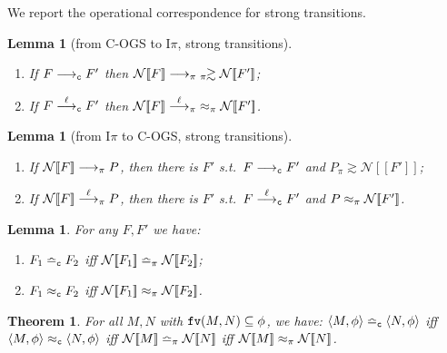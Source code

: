 \documentclass[11pt,a4paper]{amsart}
\theoremstyle{plain}
\theoremstyle{definition}
\theoremstyle{defC}
\theoremstyle{thmC}
\theoremstyle{plain}
\numberwithin{equation}{section}
\newcommand{\wb}{\bsim}
\newcommand{\bsim}{\wbPI} %
\newcommand{\pairP}[1]{  #1 }      %
\newcommand{\COGS}{\mbox{{\rm C-OGS}}\xspace}      %
\def\fv#1{\mbox{\tt fv}(#1)}         %
\newcommand{\rmm}[1]{{\tt{\lowercase{#1}}}}
\newcommand{\genarr}[2]{\mathrel{\stackrel{{#1}}{\longrightarrow}_{\rmm{\lowercase{#2}}}}}
\newcommand{\genlongrightarrow}[1]{\mathrel{\longrightarrow_{\rmm{\lowercase{#1}}}}}
\newcommand{\arrPI}[1]{\genarr{#1}{\pi}}   %
\newcommand{\longrightarrowPI}{\genlongrightarrow{\pi}}
\newcommand{\arrC}[1]{\genarr{#1}{C}}   %
\newcommand{\longrightarrowp}{\genlongrightarrow{C}}
\newcommand{\genTE}[1]{\mathrel{\bumpeq_{\rmm{\lowercase{#1}}}}}       %
\newcommand{\genwb}[1]{\mathrel{\approx_{\rmm{\lowercase{#1}}}}}       %
\newcommand{\wbPI}{\genwb{\pi}}       %
\newcommand{\wbC}{\genwb{C}}       %
\newcommand{\TEPI}{\genTE{\pi}}       %
\newcommand{\TEp}{\genTE{C}}       %
\newcommand{\contr}{\mathrel{\mbox{}_{\pi}\!\!\gtrsim}}
\newcommand{\FF}{F}
\newcommand{\encoN}[1]{{\mathcal {N}} [\! [ #1 ] \! ]  }
\newcommand{\encoSN}{\encoN}
\newcommand{\Intp}{\mbox{I$\pi$}\xspace}   %
\newcommand{\piI}{\Intp}   %
\newcommand{\conf}[1]{\langle #1\rangle}
\theoremstyle{plain}
\newtheorem{theorem}[thm]{Theorem}
\newtheorem{lemma}[thm]{Lemma}
\theoremstyle{definition}
\begin{document}
\noindent
We report the operational correspondence for strong transitions.

\begin{lemma}[from \COGS to \piI, strong transitions]
\label{l:CBNpogs_short}
$ $ \begin{enumerate}

\item  If $F \longrightarrowp F'$ then 
$ \encoSN F \longrightarrowPI \;  \contr \encoSN {F'}$; 

\item  If $F \arrC{\ell} F'$  then 
$ \encoSN F \arrPI{\ell}\;  \wbPI  \encoSN  {F'}$.
\end{enumerate}
\end{lemma}

 


\begin{lemma}[from  \piI to \COGS, strong transitions]
\label{l:CBNpogs_short_converse}
$ $ \begin{enumerate}

\item  If
$ \encoSN F \longrightarrowPI  P$, then there is $F'$ s.t.\  
 $F \longrightarrowp F'$ and 
$P 
\contr \encoSN {F'}$;

\item  If
$ \encoSN F \arrPI{\ell}  P$, then there is $F'$ s.t.\  
 $F \arrC{\ell} F'$ and 
$P 
\wbPI \encoSN {F'}$.
\end{enumerate}
\end{lemma} 



\begin{lemma} %
\label{l:ogsp_pi_traces_bisimulation_cbn}
For any $\FF,\FF'$ we have:
\begin{enumerate}
\item
 $\FF_1 \TEp \FF_2$ iff 
 $\encoN {\FF_1} \TEPI \encoN {\FF_2}$;  
\item
 $\FF_1 \wbC \FF_2$ iff 
 $\encoN {\FF_1} \wbPI  \encoN {\FF_2}$.  
\end{enumerate} 
\end{lemma} 


\begin{theorem}
\label{t:CBNfa_all}
For all $M,N$   with $\fv{M,N}\subseteq \phi$, we have: 
$\conf{ M,\phi} \TEp \conf{ N,\phi}$ iff 
$\conf{ M,\phi} \wbC \conf{ N,\phi}$ iff 
$\pairP{\encoSN M} \TEPI \pairP{\encoSN N}$
iff 
$\pairP{\encoSN M} \wb \pairP{\encoSN N}$. 
\end{theorem} 
\end{document}
